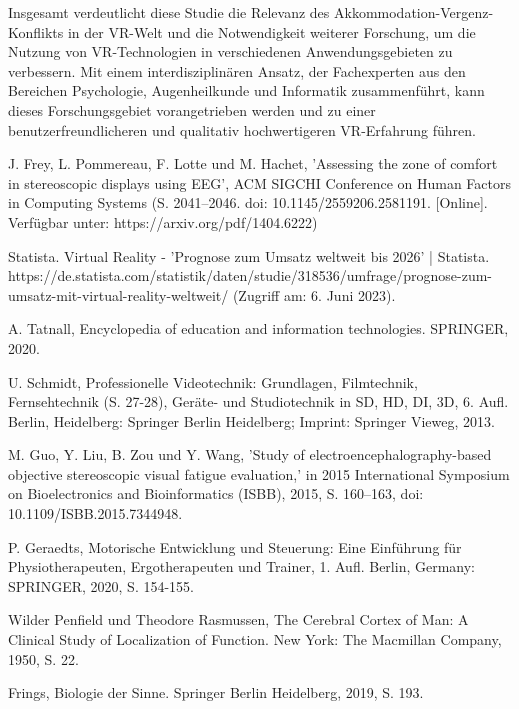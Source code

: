 \documentclass[conference]{IEEEtran}
\begin{document}
Insgesamt verdeutlicht diese Studie die Relevanz des Akkommodation-Vergenz-Konflikts in der VR-Welt und die Notwendigkeit weiterer Forschung, um die Nutzung von VR-Technologien in verschiedenen Anwendungsgebieten zu verbessern. Mit einem interdisziplinären Ansatz, der Fachexperten aus den Bereichen Psychologie, Augenheilkunde und Informatik zusammenführt, kann dieses Forschungsgebiet vorangetrieben werden und zu einer benutzerfreundlicheren und qualitativ hochwertigeren VR-Erfahrung führen.

\newpage

\begin{thebibliography}{00}
 J. Frey, L. Pommereau, F. Lotte und M. Hachet, 'Assessing the zone of comfort in stereoscopic displays using EEG', ACM SIGCHI Conference on Human Factors in Computing Systems (S. 2041–2046. doi: 10.1145/2559206.2581191. [Online]. Verfügbar unter: https://arxiv.org/pdf/1404.6222)

 Statista. Virtual Reality - 'Prognose zum Umsatz weltweit bis 2026' | Statista. https://de.statista.com/statistik/daten/studie/318536/umfrage/prognose-zum-umsatz-mit-virtual-reality-weltweit/ (Zugriff am: 6. Juni 2023).

 A. Tatnall, Encyclopedia of education and information technologies. SPRINGER, 2020.

 U. Schmidt, Professionelle Videotechnik: Grundlagen, Filmtechnik, Fernsehtechnik (S. 27-28), Geräte- und Studiotechnik in SD, HD, DI, 3D, 6. Aufl. Berlin, Heidelberg: Springer Berlin Heidelberg; Imprint: Springer Vieweg, 2013.

 M. Guo, Y. Liu, B. Zou und Y. Wang, 'Study of electroencephalography-based objective stereoscopic visual fatigue evaluation,' in 2015 International Symposium on Bioelectronics and Bioinformatics (ISBB), 2015, S. 160–163, doi: 10.1109/ISBB.2015.7344948.

 P. Geraedts, Motorische Entwicklung und Steuerung: Eine Einführung für Physiotherapeuten, Ergotherapeuten und Trainer, 1. Aufl. Berlin, Germany: SPRINGER, 2020, S. 154-155.

 Wilder Penfield und Theodore Rasmussen, The Cerebral Cortex of Man: A Clinical Study of Localization of Function. New York: The Macmillan Company, 1950, S. 22.

 Frings, Biologie der Sinne. Springer Berlin Heidelberg, 2019, S. 193.


\end{thebibliography}
\end{document}

